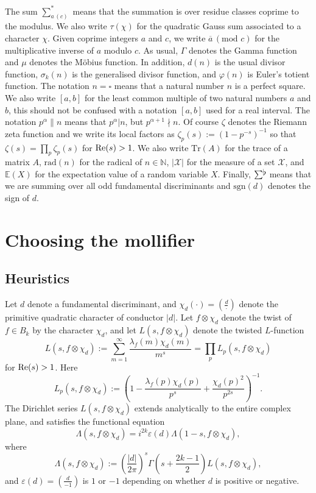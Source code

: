 \documentclass[a4paper,10pt,twoside]{amsart}
\theoremstyle{definition}
\numberwithin{equation}{section}
\newcommand\N{\mathbb{N}}
\renewcommand{\Re}{\textnormal{Re}}
\renewcommand\:{\colon}
\newcommand{\sumflat}{\mathop{{\sum}^{\raisebox{-3pt}{\makebox[0pt][l]{$\flat$}}}}}
\begin{document}
The sum $\sum_{a\,(c)}^*$ means that the summation is over residue classes coprime to the modulus. We also write $\tau(\chi)$ for the quadratic Gauss sum associated to a character $\chi$. Given coprime integers $a$ and $c$, we write $\overline a\,(\text{mod } c)$ for the multiplicative inverse of $a$ modulo $c$. As usual, $\Gamma$ denotes the Gamma function and $\mu$ denotes the M\"obius function. In addition, $d(n)$ is the usual divisor function, $\sigma_k(n)$ is the generalised divisor function, and $\varphi(n)$ is Euler's totient function. The notation $n=\square$ means that a natural number $n$ is a perfect square. We also write $[a,b]$ for the least common multiple of two natural numbers $a$ and $b$, this should not be confused with a notation $[a,b]$ used for a real interval. The notation $p^\alpha\|n$ means that $p^\alpha|n$, but $p^{\alpha+1}\nmid n$. Of course $\zeta$ denotes the Riemann zeta function and we write its local factors as $\zeta_p(s):=(1-p^{-s})^{-1}$ so that $\zeta(s)=\prod_p\zeta_p(s)$ for $\Re(s)>1$. We also write $\text{Tr}(A)$ for the trace of a matrix $A$, $\text{rad}(n)$ for the radical of $n\in\N$, $|\mathcal X|$ for the measure of a set $\mathcal X$, and $\mathbb E(X)$ for the expectation value of a random variable $X$. Finally, $\sumflat\,\,$ means that we are summing over all odd fundamental discriminants and $\text{sgn}(d)$ denotes the sign of $d$. 
  
\section{Choosing the mollifier}

\subsection{Heuristics}

\noindent Let $d$ denote a fundamental discriminant, and $\chi_d(\cdot)=\left(\frac d\cdot\right)$ denote the primitive quadratic character of conductor $|d|$. Let $f\otimes\chi_d$ denote the twist of $f\in B_{k}$ by the character $\chi_d$, and let $L(s,f\otimes\chi_d)$ denote the twisted $L$-function
\[ 
L(s,f\otimes\chi_d):=\sum_{m=1}^\infty\frac{\lambda_f(m)\chi_d(m)}{m^s}=\prod_p L_p(s,f\otimes\chi_d)\]
for $\Re(s)>1$. Here 
\[ 
L_p(s,f\otimes\chi_d):=\left(1-\frac{\lambda_f(p)\chi_d(p)}{p^s}+\frac{\chi_d(p)^2}{p^{2s}}\right)^{-1}.
\]
\noindent The Dirichlet series $L(s,f\otimes\chi_d)$ extends analytically to the entire complex plane, and satisfies the functional equation
\[\Lambda(s,f\otimes\chi_d)=i^{2k}\varepsilon(d)\Lambda(1-s,f\otimes\chi_d),
\]
where
\[
\Lambda(s,f\otimes\chi_d):=\left(\frac{|d|}{2\pi}\right)^s\Gamma\left(s+\frac{2k-1}2\right)L(s,f\otimes\chi_d),
\]
and $\varepsilon(d)=\left(\frac d{-1}\right)$ is $1$ or $-1$ depending on whether $d$ is positive or negative.  
\end{document}
